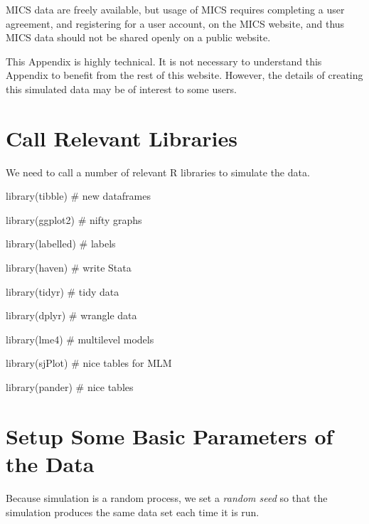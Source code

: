 \documentclass[
  letterpaper,
  DIV=11,
  numbers=noendperiod]{scrreprt}
\newenvironment{Shaded}{\begin{snugshade}}{\end{snugshade}}
\newcommand{\CommentTok}[1]{\textcolor[rgb]{0.37,0.37,0.37}{#1}}
\newcommand{\FunctionTok}[1]{\textcolor[rgb]{0.28,0.35,0.67}{#1}}
\newcommand{\NormalTok}[1]{\textcolor[rgb]{0.00,0.23,0.31}{#1}}
\begin{document}
MICS data are freely available, but usage of MICS requires completing a
user agreement, and registering for a user account, on the MICS website,
and thus MICS data should not be shared openly on a public website.

This Appendix is highly technical. It is not necessary to understand
this Appendix to benefit from the rest of this website. However, the
details of creating this simulated data may be of interest to some
users.

\hypertarget{call-relevant-libraries}{%
\section{Call Relevant Libraries}\label{call-relevant-libraries}}

We need to call a number of relevant R libraries to simulate the data.

\begin{Shaded}
\begin{Highlighting}[]
\FunctionTok{library}\NormalTok{(tibble) }\CommentTok{\# new dataframes}

\FunctionTok{library}\NormalTok{(ggplot2) }\CommentTok{\# nifty graphs}

\FunctionTok{library}\NormalTok{(labelled) }\CommentTok{\# labels}

\FunctionTok{library}\NormalTok{(haven) }\CommentTok{\# write Stata}

\FunctionTok{library}\NormalTok{(tidyr) }\CommentTok{\# tidy data}

\FunctionTok{library}\NormalTok{(dplyr) }\CommentTok{\# wrangle data}

\FunctionTok{library}\NormalTok{(lme4) }\CommentTok{\# multilevel models}

\FunctionTok{library}\NormalTok{(sjPlot) }\CommentTok{\# nice tables for MLM}

\FunctionTok{library}\NormalTok{(pander) }\CommentTok{\# nice tables}
\end{Highlighting}
\end{Shaded}

\hypertarget{setup-some-basic-parameters-of-the-data}{%
\section{Setup Some Basic Parameters of the
Data}\label{setup-some-basic-parameters-of-the-data}}

Because simulation is a random process, we set a \emph{random seed} so
that the simulation produces the same data set each time it is run.
\end{document}

